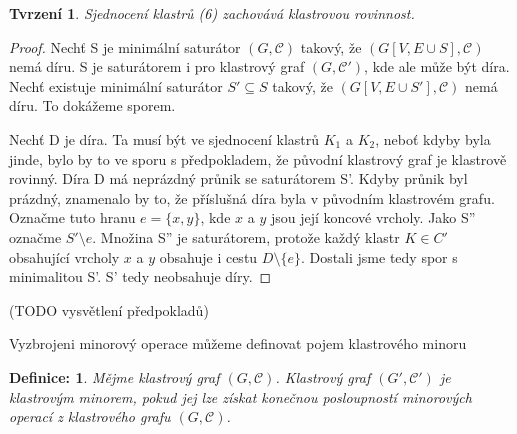 \documentclass[12pt,a4report]{report}
\newtheorem{defn}{Definice: }[chapter]
\newtheorem{tvr}{Tvrzení}[chapter]
\begin{document}
\begin{tvr} Sjednocení klastrů (6) zachovává klastrovou rovinnost.
\end{tvr}
\begin{proof}
Nechť S je minimální saturátor $(G,\mathcal C)$ takový, že $(G[V,E \cup S],\mathcal C)$ nemá díru. S je saturátorem i pro klastrový graf $(G, \mathcal C')$, kde ale může být díra.
Nechť existuje minimální saturátor $S' \subseteq S$ takový, že  $(G[V,E \cup S'],\mathcal C)$ nemá díru. To dokážeme sporem.

Nechť D je díra. Ta musí být ve sjednocení klastrů $K_1$ a $K_2$, neboť kdyby byla jinde, bylo by to ve sporu s předpokladem, že původní klastrový graf je klastrově rovinný.
Díra D má neprázdný průnik se saturátorem S'. Kdyby průnik byl prázdný, znamenalo by to, že příslušná díra byla v původním klastrovém grafu. Označme tuto hranu $e = \{x,y\}$, kde $x$ a $y$ jsou její koncové vrcholy.
Jako S'' označme $S' \setminus e$. Množina S'' je saturátorem, protože každý klastr $K \in C'$ obsahující vrcholy  $x$ a $y$ obsahuje i cestu $D \setminus \{e\}$. Dostali jsme tedy spor s minimalitou S'. S' tedy neobsahuje díry.
\end{proof}

(TODO vysvětlení předpokladů)

Vyzbrojeni minorový operace můžeme definovat pojem klastrového minoru

\begin{defn}
Mějme klastrový graf $(G,\mathcal C)$. Klastrový graf $(G',\mathcal C')$ je klastrovým minorem, pokud jej lze získat konečnou posloupností minorových operací z klastrového grafu $(G,\mathcal C)$.
\end{defn}
\end{document}
